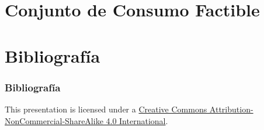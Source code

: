 \documentclass[10pt,aspectratio=169]{beamer}  %
\begin{document}
  \section{Conjunto de Consumo Factible}




\section{Bibliografía}

\nocite{*}
\begin{frame}[allowframebreaks]
\frametitle{Bibliografía}
    {%
    
    
   }
\end{frame}


{
\begin{frame}[standout]
	This presentation is licensed under a
	\href{https://creativecommons.org/licenses/by-nc-sa/4.0/}{Creative Commons Attribution-NonCommercial-ShareAlike 4.0 International}.
	
	\begin{center}
		\ccbyncsa
	\end{center}
\end{frame}
}
\end{document}
